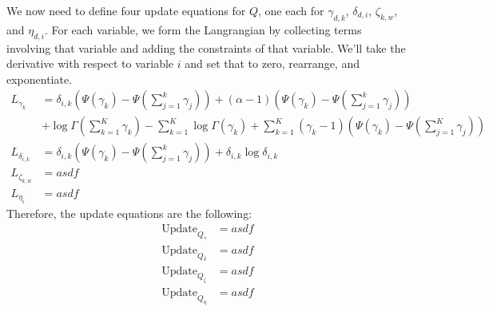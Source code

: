 \documentclass[12pt]{article}
\begin{document}
We now need to define four update equations for $Q$, one each for $\gamma_{d,k}$, $\delta_{d,i}$, $\zeta_{k,w}$, and $\eta_{d,i}$.  For each variable, we form the Langrangian by collecting terms involving that variable and adding the constraints of that variable.  We'll take the derivative with respect to variable $i$ and set that to zero, rearrange, and exponentiate.
\begin{align*}
L_{\gamma_{k}} &= \delta_{i,k}(\Psi(\gamma_k) - \Psi(\sum_{j=1}^k \gamma_j) ) + (\alpha - 1)(\Psi(\gamma_k) - \Psi(\sum_{j=1}^k \gamma_j) ) \\ 
&+ \log \Gamma (\sum\limits_{k=1}^K \gamma_k) - \sum\limits_{k=1}^K \log \Gamma(\gamma_k) + \sum\limits_{k=1}^K (\gamma_k - 1)(\Psi(\gamma_k) - \Psi(\sum_{j=1}^K \gamma_j) ) \\ 
L_{\delta_{i,k}} &= \delta_{i,k}(\Psi(\gamma_k) - \Psi(\sum_{j=1}^k \gamma_j) ) + \delta_{i,k} \log \delta_{i,k} \\
L_{\zeta_{k,w}} &= asdf \\
L_{\eta_{i}} &= asdf 
\end{align*}
Therefore, the update equations are the following:
\begin{align*}
\mathrm{Update}_{Q_\gamma} &= asdf \\ 
\mathrm{Update}_{Q_\delta} &= asdf \\
\mathrm{Update}_{Q_\zeta} &= asdf \\
\mathrm{Update}_{Q_\eta} &= asdf 
\end{align*}



\end{document}
